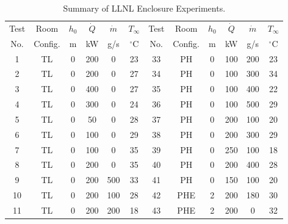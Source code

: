 \begin{table}[p]
\caption[Summary of LLNL Enclosure Experiments]{Summary of LLNL Enclosure Experiments.}
\begin{center}
\begin{tabular}{|c|c|c|c|c|c||c|c|c|c|c|c|}
\hline
Test & Room    & $h_0$ &  $\dot{Q}$ & $\dot{m}$ & $T_\infty$  &   Test & Room    & $h_0$ &  $\dot{Q}$ & $\dot{m}$ & $T_\infty$  \\
No.  & Config. & m     &  kW        & g/s       & $^\circ$C   &   No.  & Config. & m     &  kW        & g/s       & $^\circ$C   \\ \hline \hline
1    & TL      & 0     & 200        & 0         & 23          &   33   & PH      & 0     & 100        & 200       & 23          \\ \hline
2    & TL      & 0     & 200        & 0         & 27          &   34   & PH      & 0     & 100        & 300       & 34          \\ \hline
3    & TL      & 0     & 400        & 0         & 27          &   35   & PH      & 0     & 100        & 400       & 22          \\ \hline
4    & TL      & 0     & 300        & 0         & 24          &   36   & PH      & 0     & 100        & 500       & 29          \\ \hline
5    & TL      & 0     & 50         & 0         & 28          &   37   & PH      & 0     & 200        & 100       & 20          \\ \hline
6    & TL      & 0     & 100        & 0         & 29          &   38   & PH      & 0     & 200        & 300       & 29          \\ \hline
7    & TL      & 0     & 100        & 0         & 35          &   39   & PH      & 0     & 250        & 100       & 18          \\ \hline
8    & TL      & 0     & 200        & 0         & 35          &   40   & PH      & 0     & 200        & 400       & 28          \\ \hline
9    & TL      & 0     & 200        & 500       & 33          &   41   & PH      & 0     & 150        & 100       & 20          \\ \hline
10   & TL      & 0     & 200        & 100       & 28          &   42   & PHE     & 2     & 200        & 180       & 30          \\ \hline
11   & TL      & 0     & 200        & 200       & 18          &   43   & PHE     & 2     & 200        & 0         & 32          \\ \hline

\end{tabular}
\end{center}
\end{table}
